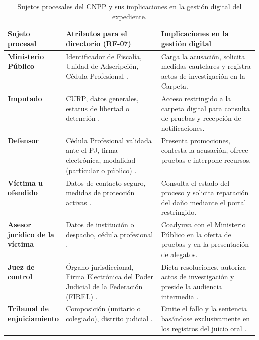 \begin{table}[H]
  \centering
  \caption{Sujetos procesales del CNPP y sus implicaciones en la gestión digital del expediente.}
  \label{tab:sujetos-procesales}
  \begin{tabularx}{\linewidth}{@{}L{0.20\linewidth}L{0.38\linewidth}X@{}}
    \toprule
    \textbf{Sujeto procesal} & \textbf{Atributos para el directorio (RF-07)} & \textbf{Implicaciones en la gestión digital} \\
    \midrule
    \textbf{Ministerio Público} & Identificador de Fiscalía, Unidad de Adscripción, Cédula Profesional \cite{pjguanajuato2015}. & Carga la acusación, solicita medidas cautelares y registra actos de investigación en la Carpeta. \\
    \addlinespace
    \textbf{Imputado} & CURP, datos generales, estatus de libertad o detención \cite{cnpp2021}. & Acceso restringido a la carpeta digital para consulta de pruebas y recepción de notificaciones. \\
    \addlinespace
    \textbf{Defensor} & Cédula Profesional validada ante el PJ, firma electrónica, modalidad (particular o público) \cite{pjguanajuato2015}. & Presenta promociones, contesta la acusación, ofrece pruebas e interpone recursos. \\
    \addlinespace
    \textbf{Víctima u ofendido} & Datos de contacto seguro, medidas de protección activas \cite{cnpp2021}. & Consulta el estado del proceso y solicita reparación del daño mediante el portal restringido. \\
    \addlinespace
    \textbf{Asesor jurídico de la víctima} & Datos de institución o despacho, cédula profesional \cite{pjguanajuato2015}. & Coadyuva con el Ministerio Público en la oferta de pruebas y en la presentación de alegatos. \\
    \addlinespace
    \textbf{Juez de control} & Órgano jurisdiccional, Firma Electrónica del Poder Judicial de la Federación (FIREL) \cite{cjf_expediente2020}. & Dicta resoluciones, autoriza actos de investigación y preside la audiencia intermedia \cite{cnpp2021}. \\
    \addlinespace
    \textbf{Tribunal de enjuiciamiento} & Composición (unitario o colegiado), distrito judicial \cite{pjguanajuato2015}. & Emite el fallo y la sentencia basándose exclusivamente en los registros del juicio oral \cite{cnpp2021}. \\
    \bottomrule
  \end{tabularx}
\end{table}

